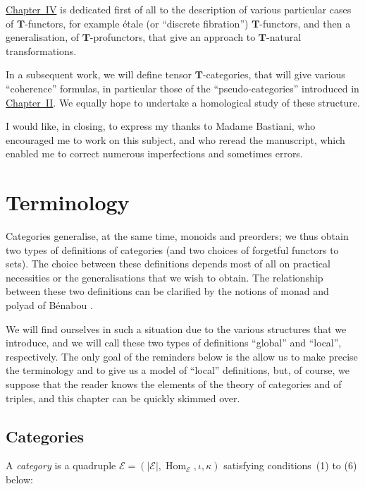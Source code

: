 \documentclass{article}
\newcommand{\oldpage}[1]{\marginpar{\footnotesize$\Big\vert$ \textit{p.~#1}}}
\newcommand{\TT}{\mathbf{T}}
\newcommand{\cat}[1]{\mathcal{#1}}
\newcommand{\set}[1]{|#1|}
\DeclareMathOperator{\Hom}{Hom}
\begin{document}
\hyperref[sec:iv]{Chapter~IV} is dedicated first of all to the description of various particular cases of $\TT$-functors, for example étale (or ``discrete fibration'') $\TT$-functors, and then a generalisation, of $\TT$-profunctors, that give an approach to $\TT$-natural transformations.

In a subsequent work, we will define tensor $\TT$-categories, that will give various ``coherence'' formulas, in particular those of the ``pseudo-categories'' introduced in \hyperref[sec:ii]{Chapter~II}.
We equally hope to undertake a homological study of these structure.

I would like, in closing, to express my thanks to Madame Bastiani, who encouraged me to work on this subject, and who reread the manuscript, which enabled me to correct numerous imperfections and sometimes errors.





\clearpage
\tableofcontents


\clearpage
\setcounter{section}{-1}
\section{Terminology}
\label{sec:0}

\oldpage{219}

Categories generalise, at the same time, monoids and preorders;
we thus obtain two types of definitions of categories (and two choices of forgetful functors to sets).
The choice between these definitions depends most of all on practical necessities or the generalisations that we wish to obtain.
The relationship between these two definitions can be clarified by the notions of monad and polyad of Bénabou \cite{Be}.

We will find ourselves in such a situation due to the various structures that we introduce, and we will call these two types of definitions ``global'' and ``local'', respectively.
The only goal of the reminders below is the allow us to make precise the terminology and to give us a model of ``local'' definitions, but, of course, we suppose that the reader knows the elements of the theory of categories and of triples, and this chapter can be quickly skimmed over.


\subsection{Categories}

A \emph{category} is a quadruple $\cat{E}=(\set{\cat{E}}, \Hom_\cat{E}, \iota, \kappa)$ satisfying conditions~(1) to (6) below:
\end{document}
